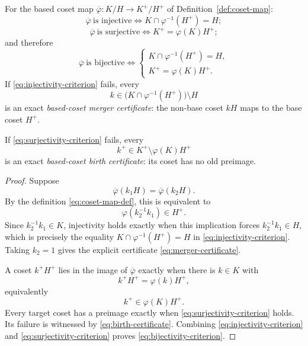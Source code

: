 \begin{theorem}\label{thm:coset-criterion}
For the based coset map \( \overline\varphi\colon K/H\to K^+/H^+ \) of Definition~\ref{def:coset-map}:
\begin{equation}\label{eq:injectivity-criterion}
  \overline\varphi\ \text{is injective}
  \iff
  K\cap\varphi^{-1}(H^+)=H;
\end{equation}
\begin{equation}\label{eq:surjectivity-criterion}
  \overline\varphi\ \text{is surjective}
  \iff
  K^+=\varphi(K)H^+;
\end{equation}
and therefore
\begin{equation}\label{eq:bijectivity-criterion}
  \overline\varphi\ \text{is bijective}
  \iff
  \begin{cases}
    K\cap\varphi^{-1}(H^+)=H,\\[2pt]
    K^+=\varphi(K)H^+ .
  \end{cases}
\end{equation}
If \eqref{eq:injectivity-criterion} fails, every
\begin{equation}\label{eq:merger-certificate}
  k\in\bigl(K\cap\varphi^{-1}(H^+)\bigr)\setminus H
\end{equation}
is an exact \emph{based-coset merger certificate}: the non-base coset \( kH \) maps to the base coset \( H^+ \).

If \eqref{eq:surjectivity-criterion} fails, every
\begin{equation}\label{eq:birth-certificate}
  k^+\in K^+\setminus\varphi(K)H^+
\end{equation}
is an exact \emph{based-coset birth certificate}: its coset has no old preimage.
\end{theorem}

\begin{proof}
Suppose
\[
  \overline\varphi(k_1H)=\overline\varphi(k_2H).
\]
By the definition \eqref{eq:coset-map-def}, this is equivalent to
\[
  \varphi(k_2^{-1}k_1)\in H^+ .
\]
Since \( k_2^{-1}k_1\in K \), injectivity holds exactly when this implication forces \( k_2^{-1}k_1\in H \), which is precisely the equality \( K\cap\varphi^{-1}(H^+)=H \) in \eqref{eq:injectivity-criterion}.  Taking \( k_2=1 \) gives the explicit certificate \eqref{eq:merger-certificate}.

A coset \( k^+H^+ \) lies in the image of \( \overline\varphi \) exactly when there is \( k\in K \) with
\[
  k^+H^+=\varphi(k)H^+,
\]
equivalently
\[
  k^+\in\varphi(K)H^+ .
\]
Every target coset has a preimage exactly when \eqref{eq:surjectivity-criterion} holds.  Its failure is witnessed by \eqref{eq:birth-certificate}.  Combining \eqref{eq:injectivity-criterion} and \eqref{eq:surjectivity-criterion} proves \eqref{eq:bijectivity-criterion}.
\end{proof}